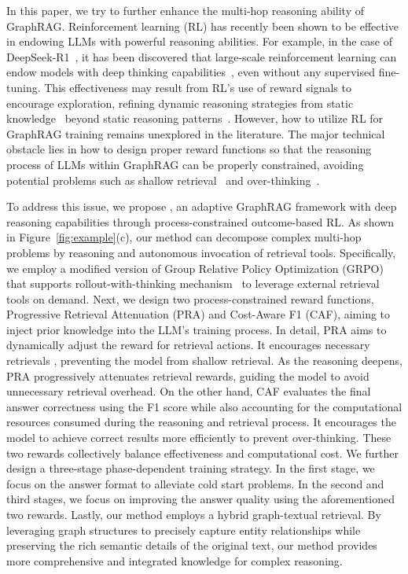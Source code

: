 In this paper, we try to further enhance the multi-hop reasoning ability of GraphRAG.
Reinforcement learning (RL) has recently been shown to be effective in endowing LLMs with powerful reasoning abilities. For example, in the case of DeepSeek-R1~\cite{guo2025deepseek}, it has been discovered that large-scale reinforcement learning can endow models with deep thinking capabilities~\cite{xie2025logic,jaech2024openai,team2025kimi}, even without any supervised fine-tuning. This effectiveness may result from RL's use of reward signals to encourage exploration, refining dynamic reasoning strategies from static knowledge~\cite{ouyang2022training} beyond static reasoning patterns~\cite{asai2024self,zhang2025corag,xiong2025mcts,deeprag}. However, how to utilize RL for GraphRAG training remains unexplored in the literature. The major technical obstacle lies in how to design proper reward functions so that the reasoning process of LLMs within GraphRAG can be properly constrained, avoiding potential problems such as shallow retrieval~\cite{helwe2021reasoning,deng2025boosting} and over-thinking~\cite{sui2025stop,chen2024not,cuesta2025large}. 

To address this issue, we propose \methodname, an adaptive GraphRAG framework with deep reasoning capabilities through process-constrained outcome-based RL. As shown in Figure~\ref{fig:example}(c), our method can decompose complex multi-hop problems by reasoning and autonomous invocation of retrieval tools. Specifically, we employ a modified version of Group Relative Policy Optimization (GRPO) that supports rollout-with-thinking mechanism~\cite{song2025r1searcher} to leverage external retrieval tools on demand. Next, we design two process-constrained reward functions, Progressive Retrieval Attenuation (PRA) and Cost-Aware F1 (CAF), aiming to inject prior knowledge into the LLM's training process.
In detail, PRA aims to dynamically adjust the reward for retrieval actions. It encourages necessary retrievals
, preventing the model from shallow retrieval. 
As the reasoning deepens, PRA progressively attenuates retrieval rewards, 
guiding the model to 
avoid unnecessary retrieval overhead. 
On the other hand, CAF evaluates the final answer correctness using the F1 score while also accounting for the computational resources consumed during the reasoning and retrieval process. It encourages the model to achieve correct results more efficiently to prevent over-thinking. These two rewards collectively balance effectiveness and computational cost. We further design a three-stage phase-dependent training strategy. In the first stage, we focus on the answer format to alleviate cold start problems. In the second and third stages, we focus on improving the answer quality using the aforementioned two rewards. 
Lastly, our method employs a hybrid graph-textual retrieval.
By leveraging graph structures to precisely capture entity relationships while preserving the rich semantic details of the original text, our method provides more comprehensive and integrated knowledge for complex reasoning.



